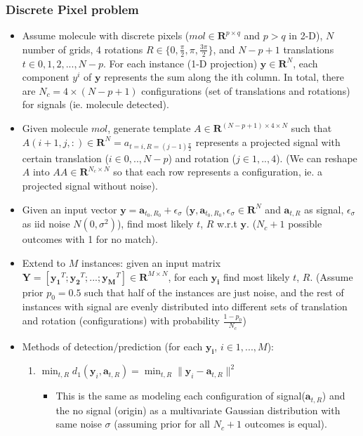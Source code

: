 \documentclass[11pt]{article}
\newcommand{\by}{\boldsymbol{y}}
\begin{document}
\subsubsection{Discrete Pixel problem}
\begin{itemize}
    \item Assume molecule with discrete pixels ($mol \in \mathbf{R}^{p \times q}$ and $p>q$ in 2-D), $N$ number of grids, 4 rotations $R \in \{0, \frac{\pi}{2}, \pi, \frac{3\pi}{2}\}$, and $N-p+1$ translations $t \in {0,1,2,...,N-p}$. For each instance (1-D projection) $\mathbf{y} \in \mathbf{R}^N$, each component $y^i$ of $\mathbf{y}$ represents the sum along the ith column. In total, there are $N_c = 4\times(N-p+1)$ configurations (set of translations and rotations) for signals (ie. molecule detected). 
    \item Given molecule $mol$, generate template $A \in \mathbf{R}^{(N-p+1) \times 4 \times N}$ such that $A(i+1,j,:) \in \mathbf{R}^N = a_{t=i, R=(j-1)\frac{\pi}{2}}$ represents a projected signal with certain translation ($i \in {0,..,N-p}$) and rotation ($j \in {1,..,4}$). (We can reshape $A$ into $AA \in \mathbf{R}^{N_c \times N}$ so that each row represents a configuration, ie. a projected signal without noise).
    \item Given an input vector $\mathbf{y} =  \mathbf{a}_{t_0,R_0} + \epsilon_\sigma$ ($\mathbf{y}, \mathbf{a}_{t_0,R_0}, \epsilon_\sigma \in \mathbf{R}^N$ and $ \mathbf{a}_{t,R}$ as signal, $\epsilon_\sigma$ as iid noise $N(0, \sigma^2)$), find most likely $t$, $R$ w.r.t $\mathbf{y}$. ($N_c+1$ possible outcomes with 1 for no match).
    \item Extend to $M$ instances: given an input matrix $\mathbf{Y} = [\mathbf{y_1}^T; \mathbf{y_2}^T; ...; \mathbf{y_M}^T] \in \mathbf{R}^{M\times N}$, for each $\mathbf{y_i}$ find most likely $t$, $R$. (Assume prior $p_0=0.5$ such that half of the instances are just noise, and the rest of instances with signal are evenly distributed into different sets of translation and rotation (configurations) with probability $\frac{1-p_0}{N_c}$)
    \item Methods of detection/prediction (for each $\mathbf{y_i}$, $i \in {1,...,M}$):
    \begin{enumerate}
        \item $\min_{t,R} d_{1}(\by_i,\mathbf{a}_{t,R}) = \min_{t, R} \lVert \by_i- \mathbf{a}_{t,R}\rVert^2$
        \begin{itemize}
            \item This is the same as modeling each configuration of signal($\mathbf{a}_{t,R}$) and the no signal (origin) as a multivariate Gaussian distribution with same noise $\sigma$ (assuming prior for all $N_c+1$ outcomes is equal).

\end{itemize}
\end{enumerate}
\end{itemize}
\end{document}
